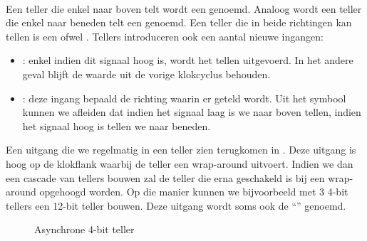 \paragraph{}
Een teller die enkel naar boven telt wordt een  genoemd. Analoog wordt een teller die enkel naar beneden telt een  genoemd. Een teller die in beide richtingen kan tellen is een  ofwel . Tellers introduceren ook een aantal nieuwe ingangen:
\begin{itemize}
 \item {}: enkel indien dit signaal hoog is, wordt het tellen uitgevoerd. In het andere geval blijft de waarde uit de vorige klokcyclus behouden.
 \item {}: deze ingang bepaald de richting waarin er geteld wordt. Uit het symbool kunnen we afleiden dat indien het signaal laag is we naar boven tellen, indien het signaal hoog is tellen we naar beneden.
\end{itemize}
Een uitgang die we regelmatig in een teller zien terugkomen in . Deze uitgang is hoog op de klokflank waarbij de teller een wrap-around uitvoert. Indien we dan een cascade van tellers bouwen zal de teller die erna geschakeld is bij een wrap-around opgehoogd worden. Op die manier kunnen we bijvoorbeeld met 3 4-bit tellers een 12-bit teller bouwen. Deze uitgang wordt soms ook de ``'' genoemd.
\begin{figure}[hbt]
\centering
{}
\caption{Asynchrone 4-bit teller}
\label{fig:asynchroneCounter}
\end{figure}
